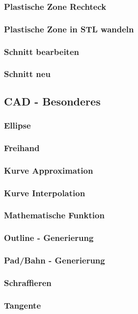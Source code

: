 \documentclass[a5paper]{book}
\begin{document}
			\subsubsection{Plastische Zone Rechteck}
			\subsubsection{Plastische Zone in STL wandeln}
			\subsubsection{Schnitt bearbeiten}
			\subsubsection{Schnitt neu}
		\subsection{CAD - Besonderes}
			\subsubsection{Ellipse}
			\subsubsection{Freihand}
			\subsubsection{Kurve Approximation}
			\subsubsection{Kurve Interpolation}
			\subsubsection{Mathematische Funktion}
			\subsubsection{Outline - Generierung}
			\subsubsection{Pad/Bahn - Generierung}
			\subsubsection{Schraffieren}
			\subsubsection{Tangente}
\end{document}
